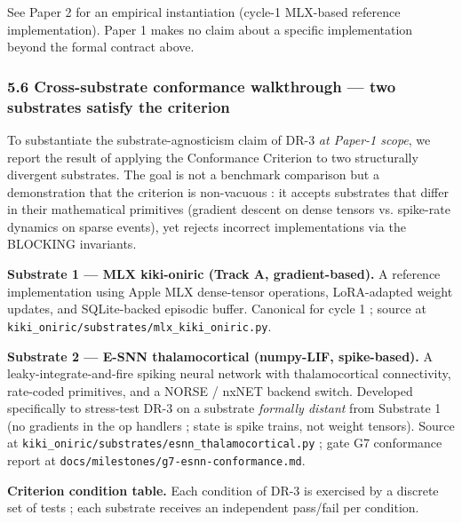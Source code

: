 \documentclass[
]{article}
\begin{document}
See Paper 2 for an empirical instantiation (cycle-1 MLX-based reference
implementation). Paper 1 makes no claim about a specific implementation
beyond the formal contract above.

\subsubsection{5.6 Cross-substrate conformance walkthrough --- two
substrates satisfy the
criterion}\label{cross-substrate-conformance-walkthrough-two-substrates-satisfy-the-criterion}

To substantiate the substrate-agnosticism claim of DR-3 \emph{at Paper-1
scope}, we report the result of applying the Conformance Criterion to
two structurally divergent substrates. The goal is not a benchmark
comparison but a demonstration that the criterion is non-vacuous : it
accepts substrates that differ in their mathematical primitives
(gradient descent on dense tensors vs. spike-rate dynamics on sparse
events), yet rejects incorrect implementations via the BLOCKING
invariants.

\textbf{Substrate 1 --- MLX kiki-oniric (Track A, gradient-based).} A
reference implementation using Apple MLX dense-tensor operations,
LoRA-adapted weight updates, and SQLite-backed episodic buffer.
Canonical for cycle 1 ; source at
\texttt{kiki\_oniric/substrates/mlx\_kiki\_oniric.py}.

\textbf{Substrate 2 --- E-SNN thalamocortical (numpy-LIF, spike-based).}
A leaky-integrate-and-fire spiking neural network with thalamocortical
connectivity, rate-coded primitives, and a NORSE / nxNET backend switch.
Developed specifically to stress-test DR-3 on a substrate \emph{formally
distant} from Substrate 1 (no gradients in the op handlers ; state is
spike trains, not weight tensors). Source at
\texttt{kiki\_oniric/substrates/esnn\_thalamocortical.py} ; gate G7
conformance report at \texttt{docs/milestones/g7-esnn-conformance.md}.

\textbf{Criterion condition table.} Each condition of DR-3 is exercised
by a discrete set of tests ; each substrate receives an independent
pass/fail per condition.
\end{document}
